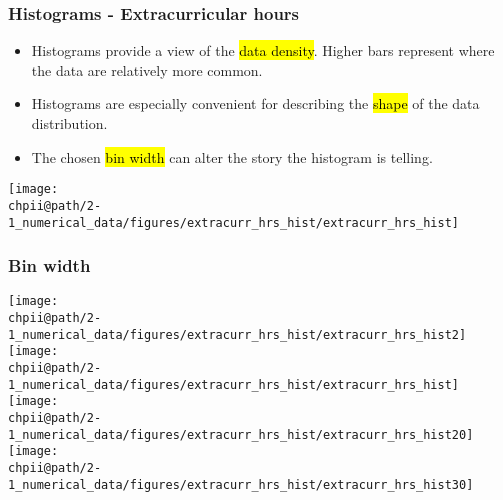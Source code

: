 \documentclass[slidestop,compress,mathserif]{beamer}
\makeatletter
\def\chpii@path{../../Chp 2}
\makeatother
\begin{document}
\begin{frame}[fragile]
\frametitle{Histograms - Extracurricular hours}

\begin{itemize}

\item Histograms provide a view of the \hl{data density}. Higher bars represent where the data are relatively more common.

\item Histograms are especially convenient for describing the \hl{shape} of the data distribution.

\item The chosen \hl{bin width} can alter the story the histogram is telling.

\end{itemize}

\begin{center}
\texttt{[image: \\chpii@path/2-1\_numerical\_data/figures/extracurr\_hrs\_hist/extracurr\_hrs\_hist]}
\end{center}

\end{frame}


\begin{frame}
\frametitle{Bin width}


\begin{center}
\texttt{[image: \\chpii@path/2-1\_numerical\_data/figures/extracurr\_hrs\_hist/extracurr\_hrs\_hist2]}
\texttt{[image: \\chpii@path/2-1\_numerical\_data/figures/extracurr\_hrs\_hist/extracurr\_hrs\_hist]} \\
\texttt{[image: \\chpii@path/2-1\_numerical\_data/figures/extracurr\_hrs\_hist/extracurr\_hrs\_hist20]}
\texttt{[image: \\chpii@path/2-1\_numerical\_data/figures/extracurr\_hrs\_hist/extracurr\_hrs\_hist30]}
\end{center}

\end{frame}

\end{document}
